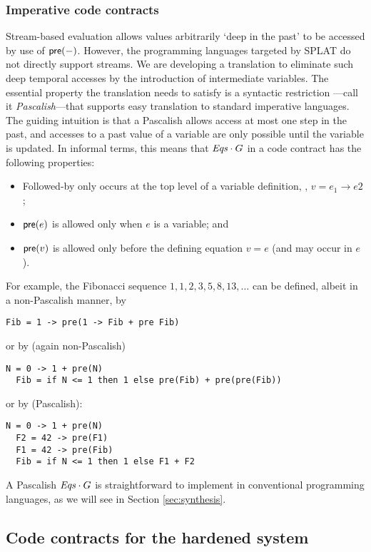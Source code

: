 \subsubsection*{Imperative code contracts}
Stream-based evaluation allows values arbitrarily `deep in the past'
to be accessed by use of $\mathsf{pre}(-)$. However, the programming
languages targeted by SPLAT do not directly support streams.  We are
developing a translation to eliminate such deep temporal accesses by
the introduction of intermediate variables. The essential property the
translation needs to satisfy is a syntactic restriction ---call
it \emph{Pascalish}---that supports easy translation to standard
imperative languages.  The guiding intuition is that a Pascalish
{\Eqs} allows access at most one step in the past, and accesses to a
past value of a variable are only possible until the variable is
updated. In informal terms, this means that ${\mathit{Eqs}}\cdot G$ in a code
contract has the following properties:
\begin{itemize}
\item Followed-by only occurs at the top level of a variable definition, \eg, $v = e_1 \to e2$;
\item $\mathsf{pre}(e)$ is allowed only when $e$ is a variable; and
\item $\mathsf{pre}(v)$ is allowed only before the defining equation $v = e$ (and may occur in $e$).
\end{itemize}
For example, the Fibonacci sequence $1,1,2,3,5,8,13,\ldots$ can be
defined, albeit in a non-Pascalish manner, by
{\small
\begin{lstlisting}[style=agree]
  Fib = 1 -> pre(1 -> Fib + pre Fib)
\end{lstlisting}
}
\noindent or by (again non-Pascalish)
{\small
\begin{lstlisting}[style=agree]
  N = 0 -> 1 + pre(N)
  Fib = if N <= 1 then 1 else pre(Fib) + pre(pre(Fib))
\end{lstlisting}
}
\noindent or by (Pascalish):
{\small
\begin{lstlisting}[style=agree]
  N = 0 -> 1 + pre(N)
  F2 = 42 -> pre(F1)
  F1 = 42 -> pre(Fib)
  Fib = if N <= 1 then 1 else F1 + F2
\end{lstlisting}
} A Pascalish ${\mathit{Eqs}} \cdot G$ is straightforward to implement in
conventional programming languages, as we will see in
Section \ref{sec:synthesis}.

\subsection{Code contracts for the hardened system}

